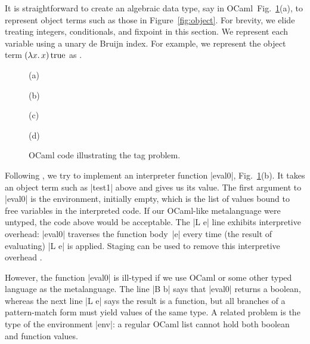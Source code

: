 It is straightforward to create an algebraic data type, say in OCaml\ifshort\
Fig.~\ref{fig:tag-problem}(a)\fi, to
represent object terms such as those in Figure~\ref{fig:object}.
For brevity, we elide treating integers, conditionals, and fixpoint in
this section.
\ifshort\else{}\fi
We represent each variable using a unary de Bruijn index.
For example, we represent the object term $(\mathopen{\lambda\mathord{x}.\,}x)\mathinner{\mathrm{true}}$ as
\ifshort {}.\else {}\fi

\ifshort
\begin{figure}
%
(a) 

(b) 

(c) 

(d) 
\caption{OCaml code illustrating the tag problem.}
\label{fig:tag-problem}
\end{figure}
\fi

\noindent Following \cite{WalidICFP02},
we try to implement an interpreter function |eval0|\ifshort,
Fig.~\ref{fig:tag-problem}(b)\fi. It takes
an object term such as |test1| above and gives us its value.
The first argument to |eval0| is the environment, initially empty,
which is the list of values bound to free variables in the
interpreted code.
\ifshort\else{}\fi
If our OCaml-like metalanguage were untyped, the code above would be 
acceptable.
The |L e| line exhibits interpretive overhead:
|eval0| traverses the function body~|e| every time (the result of
evaluating) |L e| is applied. Staging can be used to remove this
interpretive overhead \citep[\S1.1--2]{WalidICFP02}.

However, the function |eval0| is ill-typed
if we use OCaml or some other typed language as the metalanguage.
The line |B b|
says that |eval0| returns a boolean, whereas the next line |L e| says
the result is a function, but all branches of a pattern-match form must
yield values of the same type. 
A related problem is the type of the environment |env|: a regular
OCaml list cannot hold both boolean and function values. 

